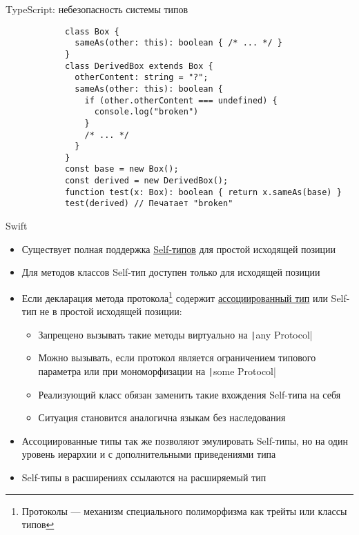 \documentclass[handout,aspectratio=169,usenames,dvipsnames]{beamer}
\begin{document}
    \begin{frame}[fragile]{TypeScript: небезопасность системы типов}
        \begin{verbatim}
            class Box {
              sameAs(other: this): boolean { /* ... */ }
            }
            class DerivedBox extends Box {
              otherContent: string = "?";
              sameAs(other: this): boolean {
                if (other.otherContent === undefined) {
                  console.log("broken")
                }
                /* ... */
              }
            }
            const base = new Box();
            const derived = new DerivedBox();
            function test(x: Box): boolean { return x.sameAs(base) }
            test(derived) // Печатает "broken"
        \end{verbatim}
    \end{frame}

    \begin{frame}{Swift}
        \begin{itemize}
            \item Существует полная поддержка \href{https://docs.swift.org/swift-book/documentation/the-swift-programming-language/types/\#Self-Type}{\color{blue}Self-типов} для простой исходящей позиции \pause
            \item Для методов классов Self-тип доступен только для исходящей позиции \pause
            \item Если декларация метода протокола\footnote{Протоколы --- механизм специального полиморфизма как трейты или классы типов} содержит \href{https://docs.swift.org/swift-book/documentation/the-swift-programming-language/generics/\#Associated-Types}{\color{blue}ассоциированный тип} или Self-тип не в простой исходящей позиции: \pause
            \begin{itemize}
                \item Запрещено вызывать такие методы виртуально на \texttt|any Protocol|
                \item Можно вызывать, если протокол является ограничением типового параметра или при мономорфизации на \texttt|some Protocol|
                \item Реализующий класс обязан заменить такие вхождения Self-типа на себя
                \item Ситуация становится аналогична языкам без наследования
            \end{itemize} \pause
            \item Ассоциированные типы так же позволяют эмулировать Self-типы, но на один уровень иерархии и с дополнительными приведениями типа \pause
            \item Self-типы в расширениях ссылаются на расширяемый тип
        \end{itemize}
    \end{frame}
\end{document}
